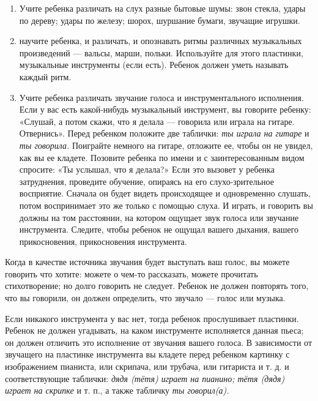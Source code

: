 \documentclass{book}
\renewcommand{\emph}[1]{\textit{#1}}
\begin{document}
\begin{enumerate}
\def\labelenumi{\arabic{enumi}.}
\item
  
  Учите ребенка различать на слух разные бытовые шумы: звон стекла,
  удары по дереву; удары по железу; шорох, шуршание бумаги, звучащие
  игрушки.
  
\item
  
  научите ребенка, и различать, и опознавать ритмы различных музыкальных
  произведений --- вальсы, марши, польки. Используйте для этого
  пластинки, музыкальные инструменты (если есть). Ребенок должен уметь
  называть каждый ритм.
  
\item
  
  Учите ребенка различать звучание голоса и инструментального
  исполнения. Если у вас есть какой-нибудь музыкальный инструмент, вы
  говорите ребенку: «Слушай, а потом скажи, что я делала --- говорила
  или играла на гитаре. Отвернись». Перед ребенком положите две
  таблички: \emph{ты играла на гитаре} и \emph{ты говорила.} Поиграйте
  немного на гитаре, отложите ее, чтобы он не увидел, как вы ее кладете.
  Позовите ребенка по имени и с заинтересованным видом спросите: «Ты
  услышал, что я делала?» Если это вызовет у ребенка затруднения,
  проведите обучение, опираясь на его слухо-зрительное восприятие.
  Сначала он будет видеть происходящее и одновременно слушать, потом
  воспринимает это же только с помощью слуха. И играть, и говорить вы
  должны на том расстоянии, на котором ощущает звук голоса или звучание
  инструмента. Следите, чтобы ребенок не ощущал вашего дыхания, вашего
  прикосновения, прикосновения инструмента.
  
\end{enumerate}


Когда в качестве источника звучания будет выступать ваш голос, вы можете
говорить что хотите: можете о чем-то рассказать, можете прочитать
стихотворение; но долго говорить не следует. Ребенок не должен повторять
того, что вы говорили, он должен определить, что звучало --- голос или
музыка.

Если никакого инструмента у вас нет, тогда ребенок прослушивает
пластинки. Ребенок не должен угадывать, на каком инструменте исполняется
данная пьеса; он должен отличить это исполнение от звучания вашего
голоса. В зависимости от звучащего на пластинке инструмента вы кладете
перед ребенком картинку с изображением пианиста, или скрипача, или
трубача, или гитариста и т. д. и соответствующие таблички: \emph{дядя
(тётя) играет на пианино; тётя (дядя) играет на скрипке} и т. п., а
также табличку \emph{ты говорил(а).}
\end{document}
